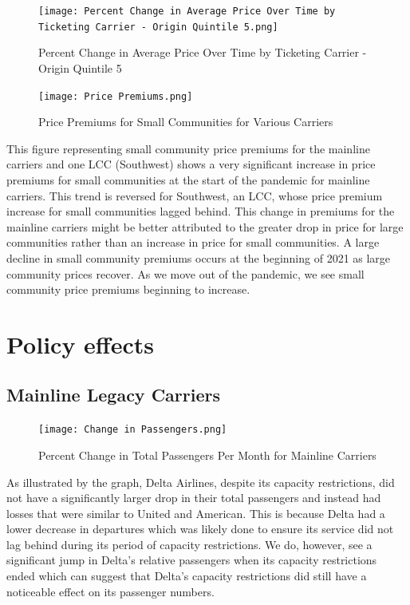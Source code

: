 \documentclass[11pt]{article}
\begin{document}
\begin{figure}[htbp!]
\centerline{\texttt{[image: Percent Change in Average Price Over Time by Ticketing Carrier - Origin Quintile 5.png]}}
  \caption{Percent Change in Average Price Over Time by Ticketing Carrier - Origin Quintile 5}
\end{figure}

\begin{figure}[htbp!]
  \centerline{\texttt{[image: Price Premiums.png]}}
  \caption{Price Premiums for Small Communities for Various Carriers}
  \label{Price Premiums}
\end{figure}
This figure representing small community price premiums for the mainline carriers and one LCC (Southwest) shows a very significant increase in price premiums for small communities at the start of the pandemic for mainline carriers. This trend is reversed for Southwest, an LCC, whose price premium increase for small communities lagged behind. This change in premiums for the mainline carriers might be better attributed to the greater drop in price for large communities rather than an increase in price for small communities. A large decline in small community premiums occurs at the beginning of 2021 as large community prices recover. As we move out of the pandemic, we see small community price premiums beginning to increase.


\newline

\section{Policy effects}
\subsection{Mainline Legacy Carriers}

\begin{figure}[htbp!]
  \centerline{\texttt{[image: Change in Passengers.png]}}
  \caption{Percent Change in Total Passengers Per Month for Mainline Carriers}
  \label{mainline_passengers}
\end{figure}

As illustrated by the graph, Delta Airlines, despite its capacity restrictions, did not have a significantly larger drop in their total passengers and instead had losses that were similar to United and American. This is because Delta had a lower decrease in departures which was likely done to ensure its service did not lag behind during its period of capacity restrictions. We do, however, see a significant jump in Delta’s relative passengers when its capacity restrictions ended which can suggest that Delta’s capacity restrictions did still have a noticeable effect on its passenger numbers.\newline
\end{document}
